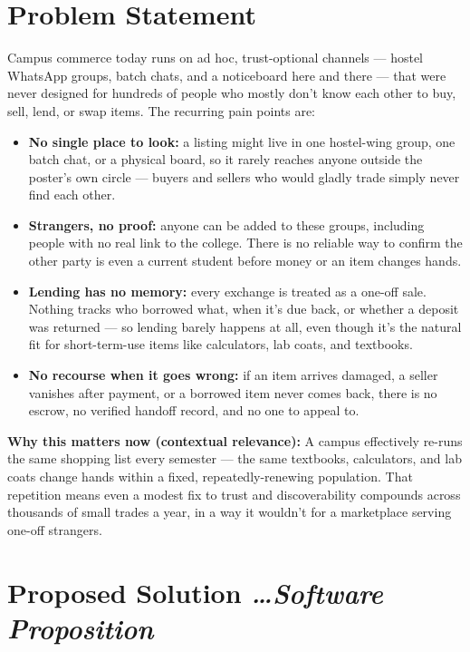 \documentclass[11pt,a4paper]{article}
\newcommand{\BvrHint}[1]{%
  {\normalfont\normalsize\itshape\hfill #1}}
\begin{document}
\section{Problem Statement}
Campus commerce today runs on ad hoc, trust-optional channels — hostel
WhatsApp groups, batch chats, and a noticeboard here and there — that were
never designed for hundreds of people who mostly don't know each other to
buy, sell, lend, or swap items. The recurring pain points are:
\begin{itemize}[leftmargin=0.7cm]
    \item \textbf{No single place to look:} a listing might live in one hostel-wing group, one batch chat, or a physical board, so it rarely reaches anyone outside the poster's own circle — buyers and sellers who would gladly trade simply never find each other.
    \item \textbf{Strangers, no proof:} anyone can be added to these groups, including people with no real link to the college. There is no reliable way to confirm the other party is even a current student before money or an item changes hands.
    \item \textbf{Lending has no memory:} every exchange is treated as a one-off sale. Nothing tracks who borrowed what, when it's due back, or whether a deposit was returned — so lending barely happens at all, even though it's the natural fit for short-term-use items like calculators, lab coats, and textbooks.
    \item \textbf{No recourse when it goes wrong:} if an item arrives damaged, a seller vanishes after payment, or a borrowed item never comes back, there is no escrow, no verified handoff record, and no one to appeal to.
\end{itemize}

\textbf{Why this matters now (contextual relevance):} A campus effectively re-runs the same shopping list every semester — the same textbooks, calculators, and lab coats change hands within a fixed, repeatedly-renewing population. That repetition means even a modest fix to trust and discoverability compounds across thousands of small trades a year, in a way it wouldn't for a marketplace serving one-off strangers.

\section{Proposed Solution %
\BvrHint{\ldots Software Proposition}}
\end{document}
